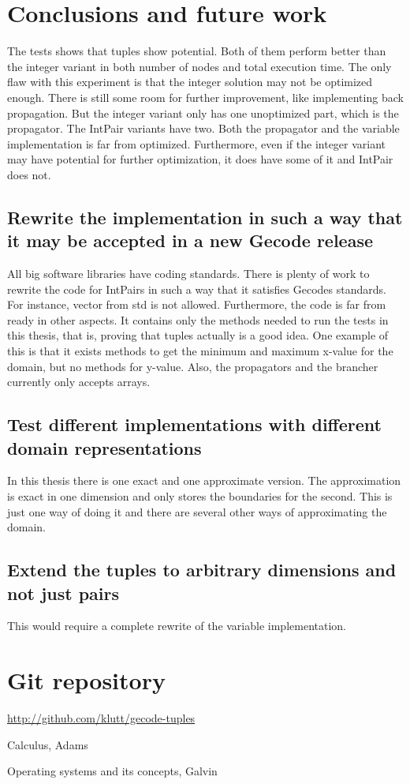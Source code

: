 \documentclass[a4paper,11pt]{article}
\begin{document}
\section{Conclusions and future work}
The tests shows that tuples show potential. Both of them perform better than the integer variant in both number of nodes and total execution time. The only flaw with this experiment is that the integer solution may not be optimized enough. There is still some room for further improvement, like implementing back propagation. But the integer variant only has one unoptimized part, which is the propagator. The IntPair variants have two. Both the propagator and the variable implementation is far from optimized. Furthermore, even if the integer variant may have potential for further optimization, it does have some of it and IntPair does not. 
\subsection{Rewrite the implementation in such a way that it may be accepted in a new Gecode release}
All big software libraries have coding standards. There is plenty of work to rewrite the code for IntPairs in such a way that it satisfies Gecodes standards. For instance, vector from std is not allowed. Furthermore, the code is far from ready in other aspects. It contains only the methods needed to run the tests in this thesis, that is, proving that tuples actually is a good idea. One example of this is that it exists methods to get the minimum and maximum x-value for the domain, but no methods for y-value. Also, the propagators and the brancher currently only accepts arrays.

\subsection{Test different implementations with different domain representations}
In this thesis there is one exact and one approximate version. The approximation is exact in one dimension and only stores the boundaries for the second. This is just one way of doing it and there are several other ways of approximating the domain.

\subsection{Extend the tuples to arbitrary dimensions and not just pairs}
This would require a complete rewrite of the variable implementation.

\section{Git repository}
\url{http://github.com/klutt/gecode-tuples}

\begin{thebibliography}{99}
	Calculus, 
	Adams
	
	Operating systems and its concepts,
	Galvin
\end{thebibliography}
\end{document}
